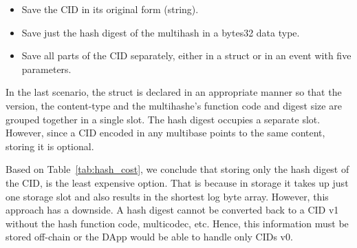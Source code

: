 \begin{itemize}[topsep=0pt, itemsep=0pt]
\item{Save the CID in its original form (string).}
\item{Save just the hash digest of the multihash in a bytes32 data type.} 
\item{Save all parts of the CID separately, either in a struct or in an event with five parameters.}
\end{itemize}

In the last scenario, the struct is declared in an appropriate manner so that the version, the content-type and the multihashe’s function code and digest size are grouped together in a single slot. The hash digest occupies a separate slot. However, since a CID encoded in any multibase points to the same content, storing it is optional.

Based on Table~\ref{tab:hash_cost}, we conclude that storing only the hash digest of the CID, is the least expensive option. That is because in storage it takes up just one storage slot and also results in the shortest log byte array. However, this approach has a downside. A hash digest cannot be converted back to a CID v1 without the hash function code, multicodec, etc. Hence, this information must be stored off-chain or the DApp would be able to handle only CIDs v0.

\begin{table}[htbp]
\centering
\caption{Cost of storing data identifiers (gas)}
\label{tab:hash_cost}
\end{table}

